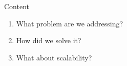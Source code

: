 \begin{frame}{Content}

\begin{enumerate}
    \item What problem are we addressing?
    \item How did we solve it?
    \item What about scalability?
\end{enumerate}

\end{frame}
